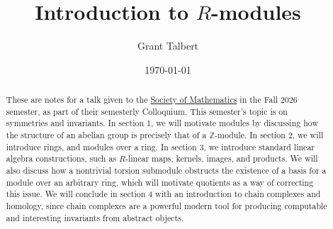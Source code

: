 \documentclass{article}
\title{Introduction to $R$-modules}
\author{Grant Talbert}
\date{\today}
\begin{document}
\maketitle
\begin{abstract}
	These are notes for a talk given to the \href{https://societyofmathematics.github.io/}{Society of Mathematics} in the Fall 2026 semester, as part of their semesterly Colloquium. This semester's topic is on symmetries and invariants. In section 1, we will motivate modules by discussing how the structure of an abelian group is precisely that of a $\mathbb{Z} $-module. In section 2, we will introduce rings, and modules over a ring. In section 3, we introduce standard linear algebra constructions, such as $R$-linear maps, kernels, images, and products. We will also discuss how a nontrivial torsion submodule obstructs the existence of a basis for a module over an arbitrary ring, which will motivate quotients as a way of correcting this issue. We will conclude in section 4 with an introduction to chain complexes and homology, since chain complexes are a powerful modern tool for producing computable and interesting invariants from abstract objects.
\end{abstract}

\tableofcontents





\end{document}
